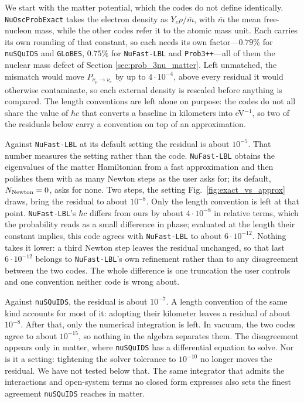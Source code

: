 \documentclass[final,5p,times,twocolumn,sort,compress]{elsarticle}
\newcommand{\fig}{Fig.}
\newcommand{\figu}[1]{\fig~\ref{fig:#1}}
\begin{document}
We start with the matter potential, which the codes do not define identically.  {\tt NuOscProbExact} takes the electron density as $Y_e \rho / \bar{m}$, with $\bar{m}$ the mean free-nucleon mass, while the other codes refer it to the atomic mass unit.  Each carries its own rounding of that constant, so each needs its own factor---$0.79\%$ for {\tt nuSQuIDS} and {\tt GLoBES}, $0.75\%$ for {\tt NuFast-LBL} and {\tt Prob3++}---all of them the nuclear mass defect of Section \ref{sec:prob_3nu_matter}.  Left unmatched, the mismatch would move $P_{\nu_\mu \to \nu_e}$ by up to $4 \cdot 10^{-4}$, above every residual it would otherwise contaminate, so each external density is rescaled before anything is compared.  The length conventions are left alone on purpose: the codes do not all share the value of $\hbar c$ that converts a baseline in kilometers into eV$^{-1}$, so two of the residuals below carry a convention on top of an approximation.

Against {\tt NuFast-LBL} at its default setting the residual is about $10^{-5}$.  That number measures the setting rather than the code.  {\tt NuFast-LBL} obtains the eigenvalues of the matter Hamiltonian from a fast approximation and then polishes them with as many Newton steps as the user asks for; its default, $N_{\rm Newton} = 0$, asks for none.  Two steps, the setting \figu{exact_vs_approx} draws, bring the residual to about $10^{-8}$.  Only the length convention is left at that point.  {\tt NuFast-LBL}'s $\hbar c$ differs from ours by about $4 \cdot 10^{-8}$ in relative terms, which the probability reads as a small difference in phase; evaluated at the length their constant implies, this code agrees with {\tt NuFast-LBL} to about $6 \cdot 10^{-12}$.  Nothing takes it lower: a third Newton step leaves the residual unchanged, so that last $6 \cdot 10^{-12}$ belongs to {\tt NuFast-LBL}'s own refinement rather than to any disagreement between the two codes.  The whole difference is one truncation the user controls and one convention neither code is wrong about.

Against {\tt nuSQuIDS}, the residual is about $10^{-7}$.  A length convention of the same kind accounts for most of it: adopting their kilometer leaves a residual of about $10^{-8}$.  After that, only the numerical integration is left.  In vacuum, the two codes agree to about $10^{-15}$, so nothing in the algebra separates them.  The disagreement appears only in matter, where {\tt nuSQuIDS} has a differential equation to solve.  Nor is it a setting: tightening the solver tolerance to $10^{-10}$ no longer moves the residual.  We have not tested below that.  The same integrator that admits the interactions and open-system terms no closed form expresses also sets the finest agreement {\tt nuSQuIDS} reaches in matter.
\end{document}
